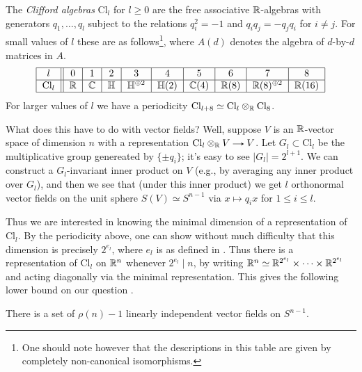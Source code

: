 \newcommand{\Cl}{\mathrm{Cl}}
\newcommand{\HH}{\mathbb{H}}
\begin{nothing}
  \label{clifford}
  The \emph{Clifford algebras} $\Cl_l$ for $l \ge 0$ are the free
  associative $\mathbb{R}$-algebras with generators $q_1,\ldots,q_l$ subject
  to the relations $q_i^2 = -1$ and $q_iq_j = -q_jq_i$ for $i \ne
  j$. For small values of $l$ these are as follows\footnote{One should
    note however that the descriptions in this table are given by
    completely non-canonical isomorphisms.}, where $A(d)$
  denotes the algebra of $d$-by-$d$ matrices in $A$.
  \[
    \begin{tabular}{|c||c|c|c|c|c|c|c|c|c|}
      \hline
      $l$ & 0 & 1 & 2 & 3 & 4 & 5 & 6 & 7 & 8 \\
      \hline
      $\Cl_l$ & $\R$ & $\C$ & $\HH$ & $\HH^{\oplus 2}$ & $\HH(2)$ &
      $\C(4)$ & $\R(8)$ & $\R(8)^{\oplus 2}$ & $\R(16)$ \\
      \hline
    \end{tabular}
  \]
  For larger values of $l$ we have a periodicity $\Cl_{l+8} \simeq
  \Cl_l \otimes_\R \Cl_8$.

  What does this have to do with vector fields? Well, suppose $V$ is
  an $\mathbb{R}$-vector space of dimension $n$ with a representation $\Cl_l
  \otimes_\R V \to V$. Let $G_l \subset \Cl_l$ be the multiplicative
  group genereated by $\{\pm q_i\}$; it's easy to see $|G_l| =
  2^{l+1}$. We can construct a $G_l$-invariant inner product on $V$
  (e.g., by averaging any inner product over $G_l$), and then we see
  that (under this inner product) we get $l$ orthonormal vector fields
  on the unit sphere $S(V) \simeq S^{n-1}$ via $x \mapsto q_ix$ for
  $1 \le i \le l$.

  Thus we are interested in knowing the minimal dimension of a
  representation of $\Cl_l$. By the periodicity above, one can show
  without much difficulty that this dimension is precisely $2^{e_l}$,
  where $e_l$ is as defined in . Thus there is a
  representation of $\Cl_l$ on $\mathbb{R}^n$ whenever $2^{e_l} \mid n$, by
  writing $\mathbb{R}^n \simeq \mathbb{R}^{2^{e_l}} \times \cdots \times \mathbb{R}^{2^{e_l}}$
  and acting diagonally via the minimal representation. This gives the
  following lower bound on our question .
\end{nothing}

\begin{theorem}
  \label{vfield-lower-bound}
  There is a set of $\rho(n)-1$ linearly independent vector fields on
  $S^{n-1}$.
\end{theorem}

